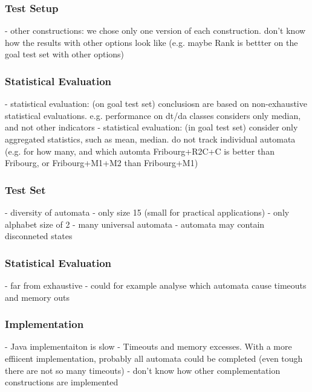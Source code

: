 \subsubsection{Test Setup}
- other constructions: we chose only one version of each construction. don't know how the results with other options look like (e.g. maybe Rank is bettter on the goal test set with other options)

\subsubsection{Statistical Evaluation}
- statistical evaluation: (on goal test set) conclusiosn are based on non-exhaustive statistical evaluations. e.g. performance on dt/da classes considers only median, and not other indicators
- statistical evaluation: (in goal test set) consider only aggregated statistics, such as mean, median. do not track individual automata (e.g. for how many, and which automta Fribourg+R2C+C is better than Fribourg, or Fribourg+M1+M2 than Fribourg+M1)





\subsubsection{Test Set}
- diversity of automata
    - only size 15 (small for practical applications)
    - only alphabet size of 2
- many universal automata
- automata may contain disconneted states



\subsubsection{Statistical Evaluation}
- far from exhaustive
- could for example analyse which automata cause timeouts and memory outs


\subsubsection{Implementation}
- Java implementaiton is slow
    - Timeouts and memory excesses. With a more effiicent implementation, probably all automata could be completed (even tough there are not so many timeouts)
- don't know how other complementation constructions are implemented







